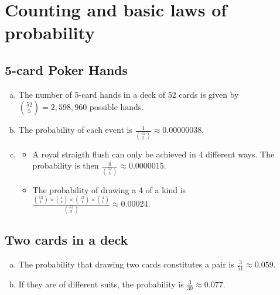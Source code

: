 \documentclass[a4paper]{article}
\date{}
\begin{document}
\thispagestyle{fancy}

\section{Counting and basic laws of probability}

    \subsection{5-card Poker Hands}
        \begin{enumerate}[a)]
            \item The number of 5-card hands in a deck of 52 cards is given by ${52 \choose 5} = 2,598,960$ possible hands.
            \item The probability of each event is $\frac{1}{{52 \choose 5}} \approx 0.00000038$.
            \item
                \begin{itemize}
                    \item A royal straigth flush can only be achieved in 4 different ways. The probability is then $\frac{4}{{52 \choose 5}} \approx 0.0000015$.
                    \item The probability of drawing a 4 of a kind is $\frac{{13 \choose 1}\times{4 \choose 4}\times{12 \choose 1}\times{4 \choose 1}}{{52 \choose 5}} \approx 0.00024$.
                \end{itemize}
        \end{enumerate}

    \subsection{Two cards in a deck}
        \begin{enumerate}[a)]
            \item The probability that drawing two cards constitutes a pair is $\frac{3}{51} \approx 0.059$.
            \item If they are of different suits, the probability is $\frac{3}{39} \approx 0.077$.
        \end{enumerate}
\end{document}

